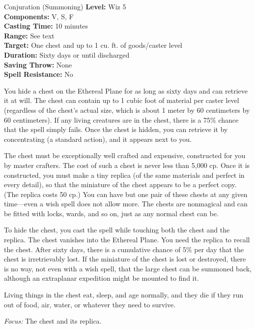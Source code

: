 {Conjuration (Summoning)}
{
	\textbf{Level:}
	Wiz 5\\
	\textbf{Components:}
	V, S, F\\
	\textbf{Casting Time:}
	10 minutes\\
	\textbf{Range:}
	See text\\
	\textbf{Target:}
	One chest and up to 1 cu. ft. of goods/caster level\\
	\textbf{Duration:}
	Sixty days or until discharged\\
	\textbf{Saving Throw:}
	None\\
	\textbf{Spell Resistance:}
	No\\
}
{
	You hide a chest on the Ethereal Plane for as long as sixty days and can retrieve it at will. The chest can contain up to 1 cubic foot of material per caster level (regardless of the chest's actual size, which is about 1 meter by 60 centimeters by 60 centimeters). If any living creatures are in the chest, there is a 75\% chance that the spell simply fails. Once the chest is hidden, you can retrieve it by concentrating (a standard action), and it appears next to you.

	The chest must be exceptionally well crafted and expensive, constructed for you by master crafters. The cost of such a chest is never less than 5,000 cp. Once it is constructed, you must make a tiny replica (of the same materials and perfect in every detail), so that the miniature of the chest appears to be a perfect copy. (The replica costs 50 cp.) You can have but one pair of these chests at any given time---even a wish spell does not allow more. The chests are nonmagical and can be fitted with locks, wards, and so on, just as any normal chest can be.

	To hide the chest, you cast the spell while touching both the chest and the replica. The chest vanishes into the Ethereal Plane. You need the replica to recall the chest. After sixty days, there is a cumulative chance of 5\% per day that the chest is irretrievably lost. If the miniature of the chest is lost or destroyed, there is no way, not even with a wish spell, that the large chest can be summoned back, although an extraplanar expedition might be mounted to find it.

	Living things in the chest eat, sleep, and age normally, and they die if they run out of food, air, water, or whatever they need to survive.

	\textit{Focus:}
	The chest and its replica.

}
